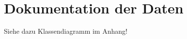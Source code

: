 
\thispagestyle{plain}

\chapter{Dokumentation der Daten}\label{c_data}
Siehe dazu Klassendiagramm im Anhang!